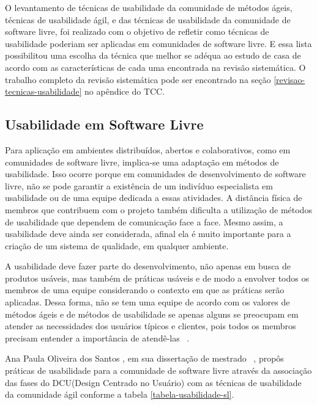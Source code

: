 %
O levantamento de técnicas de usabilidade da comunidade de métodos ágeis, técnicas
de usabilidade ágil, e das técnicas de usabilidade da comunidade de software livre, foi
realizado com o objetivo de refletir como técnicas de usabilidade poderiam ser aplicadas
em comunidades de software livre. E essa lista possibilitou uma escolha da técnica que melhor se adéqua ao estudo de casa de acordo com as características de cada uma encontrada na revisão sistemática. O trabalho completo da revisão sistemática pode ser encontrado na seção \ref{revisao-tecnicas-usabilidade} no apêndice do TCC.

\subsection{Usabilidade em Software Livre}
\label{usabilidade-sl}
%
Para aplicação em ambientes distribuídos, abertos e colaborativos, como em comunidades de software livre, implica-se uma adaptação em métodos de usabilidade. Isso ocorre porque em comunidades de desenvolvimento de software livre, não se pode garantir a existência de um indivíduo especialista em usabilidade ou de uma equipe dedicada a essas atividades. A distância física de membros que contribuem com o projeto também dificulta a utilização de métodos de usabilidade que dependem de comunicação face a face. Mesmo assim, a usabilidade deve ainda ser considerada, afinal ela é muito importante para a criação de um sistema de qualidade, em qualquer ambiente.

%
A usabilidade deve fazer parte do desenvolvimento, não apenas em busca de produtos usáveis, mas também de práticas usáveis e de modo a envolver todos os membros de uma equipe considerando o contexto em que as práticas serão aplicadas. Dessa forma, não se tem uma equipe de acordo com os valores de métodos ágeis e de métodos de usabilidade se apenas alguns se preocupam em atender as necessidades dos usuários típicos e clientes, pois todos os membros precisam entender a importância de atendê-las ~\cite{santos2012}.

%
Ana Paula Oliveira dos Santos , em sua dissertação de mestrado ~\cite{santos2012}, propôs práticas de usabilidade para a comunidade de software livre através da associação das fases do DCU(Design Centrado no Usuário) com as técnicas de usabilidade da comunidade ágil conforme a tabela \ref{tabela-usabilidade-sl}.

